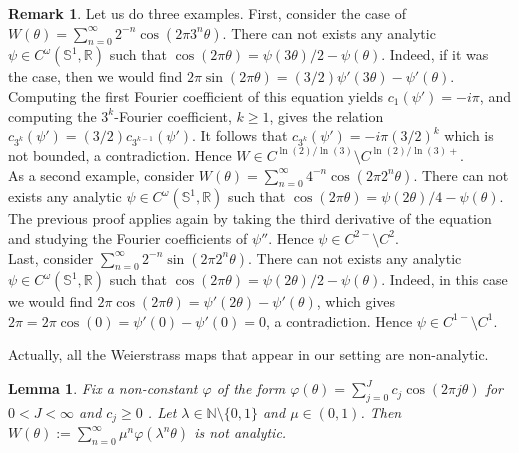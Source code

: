 \documentclass[11pt]{amsart}
\theoremstyle{plain}
\newtheorem{lemma}[theorem]{Lemma}
\theoremstyle{definition}
\newtheorem{remark}[theorem]{Remark}
\numberwithin{equation}{section}
\begin{document}
\begin{remark}
Let us do three examples. First, consider the case of $W(\theta) = \sum_{n=0}^\infty 2^{-n} \cos(2\pi 3^n \theta)$. There can not exists any analytic $\psi \in C^\omega(\mathbb{S}^1,\mathbb{R})$ such that $\cos(2 \pi \theta) = {\psi(3\theta)}/2-\psi(\theta)$. Indeed, if it was the case, then we would find  $2\pi \sin(2 \pi  \theta) = (3/2) \psi'(3\theta)-\psi'(\theta)$. Computing the first Fourier coefficient of this equation yields $c_1(\psi')=- i \pi$, and computing the $3^k$-Fourier coefficient, $k \geq 1$, gives the relation $c_{3^k}(\psi') = (3/2) c_{3^{k-1}}(\psi')$. It follows that $ c_{3^k}(\psi')  = - i \pi (3/2)^k$ which is not bounded, a contradiction. Hence $W \in C^{\ln(2)/\ln(3)} \setminus C^{\ln(2)/\ln(3)+}$. \\

As a second example, consider $W(\theta) = \sum_{n=0}^\infty 4^{-n} \cos(2\pi 2^n \theta)$. There can not exists any analytic $\psi \in C^\omega(\mathbb{S}^1,\mathbb{R})$ such that $\cos(2 \pi \theta) = {\psi(2\theta)}/4-\psi(\theta)$. The previous proof applies again by taking the third derivative of the equation and studying the Fourier coefficients of $\psi''$. Hence $\psi \in C^{2-} \setminus C^2$. \\

Last, consider $\sum_{n=0}^\infty 2^{-n} \sin(2 \pi 2^n \theta)$. There can not exists any analytic $\psi \in C^\omega(\mathbb{S}^1,\mathbb{R})$ such that $\cos(2 \pi \theta) = {\psi(2\theta)}/2-\psi(\theta)$. Indeed, in this case we would find $2\pi \cos(2 \pi \theta) = \psi'(2\theta)-\psi'(\theta)$, which gives $2\pi = 2\pi \cos(0) = \psi'(0)-\psi'(0)=0$, a contradiction. Hence $\psi \in C^{1-} \setminus C^1$.
\end{remark}

Actually, all the Weierstrass maps that appear in our  setting are non-analytic.

\begin{lemma}
Fix a non-constant $\varphi$ of the form $\varphi(\theta) = \sum_{j=0}^J c_j \cos(2 \pi j \theta) $ for $0<J<\infty$ and $c_j \geq 0$ . Let $\lambda \in \mathbb{N} \setminus \{0,1\}$ and $\mu \in (0,1)$. Then $W(\theta) := \sum_{n=0}^\infty \mu^n \varphi(\lambda^n \theta)$ is not analytic.
\end{lemma}
\end{document}
